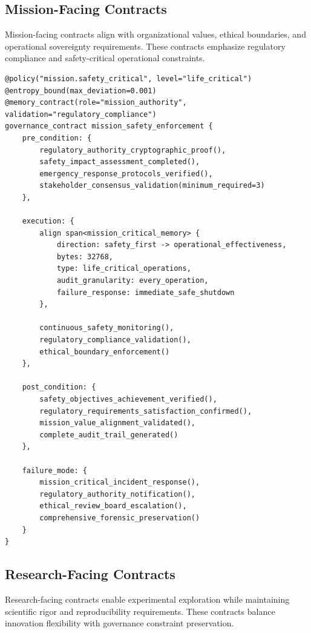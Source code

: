 \documentclass[11pt,letterpaper]{article}
\begin{document}
\subsection{Mission-Facing Contracts}

Mission-facing contracts align with organizational values, ethical boundaries, and operational sovereignty requirements. These contracts emphasize regulatory compliance and safety-critical operational constraints.

\begin{lstlisting}[language=rift, caption=Mission-Critical Safety Contract Template]
@policy("mission.safety_critical", level="life_critical")
@entropy_bound(max_deviation=0.001)
@memory_contract(role="mission_authority", validation="regulatory_compliance")
governance_contract mission_safety_enforcement {
    pre_condition: {
        regulatory_authority_cryptographic_proof(),
        safety_impact_assessment_completed(),
        emergency_response_protocols_verified(),
        stakeholder_consensus_validation(minimum_required=3)
    },
    
    execution: {
        align span<mission_critical_memory> {
            direction: safety_first -> operational_effectiveness,
            bytes: 32768,
            type: life_critical_operations,
            audit_granularity: every_operation,
            failure_response: immediate_safe_shutdown
        },
        
        continuous_safety_monitoring(),
        regulatory_compliance_validation(),
        ethical_boundary_enforcement()
    },
    
    post_condition: {
        safety_objectives_achievement_verified(),
        regulatory_requirements_satisfaction_confirmed(),
        mission_value_alignment_validated(),
        complete_audit_trail_generated()
    },
    
    failure_mode: {
        mission_critical_incident_response(),
        regulatory_authority_notification(),
        ethical_review_board_escalation(),
        comprehensive_forensic_preservation()
    }
}
\end{lstlisting}

\subsection{Research-Facing Contracts}

Research-facing contracts enable experimental exploration while maintaining scientific rigor and reproducibility requirements. These contracts balance innovation flexibility with governance constraint preservation.
\end{document}
